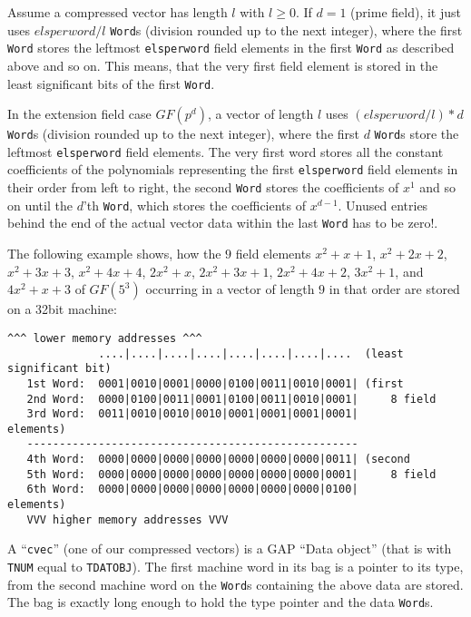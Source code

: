 \documentclass[a4paper,11pt]{report}
\begin{document}
{{{ Assume a compressed vector has length $l$ with $l \geq 0$. If $d=1$ (prime field), it just uses $elsperword/l$ \texttt{Word}s (division rounded up to the next integer), where the first \texttt{Word} stores the leftmost \texttt{elsperword} field elements in the first \texttt{Word} as described above and so on. This means, that the very first field element is
stored in the least significant bits of the first \texttt{Word}. 

 In the extension field case $GF(p^d)$, a vector of length $l$ uses $(elsperword/l)*d$ \texttt{Word}s (division rounded up to the next integer), where the first $d$ \texttt{Word}s store the leftmost \texttt{elsperword} field elements. The very first word stores all the constant coefficients of
the polynomials representing the first \texttt{elsperword} field elements in their order from left to right, the second \texttt{Word} stores the coefficients of $x^1$ and so on until the $d$'th \texttt{Word}, which stores the coefficients of $x^{{d-1}}$. Unused entries behind the end of the actual vector data within the last \texttt{Word} has to be zero!.

 The following example shows, how the $9$ field elements $x^2+x+1$, $x^2+2x+2$, $x^2+3x+3$, $x^2+4x+4$, $2x^2+x$, $2x^2+3x+1$, $2x^2+4x+2$, $3x^2+1$, and $4x^2+x+3$ of $GF(5^3)$ occurring in a vector of length $9$ in that order are stored on a 32bit machine: 
\begin{Verbatim}[commandchars=!@A,fontsize=\small,frame=single,label=Example]
   ^^^ lower memory addresses ^^^
              ....|....|....|....|....|....|....|....  (least significant bit)
   1st Word:  0001|0010|0001|0000|0100|0011|0010|0001| (first
   2nd Word:  0000|0100|0011|0001|0100|0011|0010|0001|     8 field
   3rd Word:  0011|0010|0010|0010|0001|0001|0001|0001|        elements)
   ---------------------------------------------------
   4th Word:  0000|0000|0000|0000|0000|0000|0000|0011| (second
   5th Word:  0000|0000|0000|0000|0000|0000|0000|0001|     8 field
   6th Word:  0000|0000|0000|0000|0000|0000|0000|0100|        elements)
   VVV higher memory addresses VVV
\end{Verbatim}
 A ``\texttt{cvec}'' (one of our compressed vectors) is a \textsf{GAP} ``Data object'' (that is with \texttt{TNUM} equal to \texttt{T{\textunderscore}DATOBJ}). The first machine word in its bag is a pointer to its type, from the second
machine word on the \texttt{Word}s containing the above data are stored. The bag is exactly long enough to hold
the type pointer and the data \texttt{Word}s.

}}}
\end{document}
